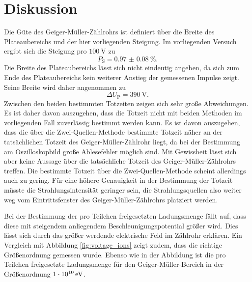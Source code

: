 \section{Diskussion}
\label{sec:Diskussion}
Die Güte des Geiger-Müller-Zählrohrs ist definiert über die Breite des Plateaubereichs und der hier vorliegenden Steigung.
Im vorliegenden Versuch ergibt sich die Steigung pro $\SI{100}{\volt}$ zu
\begin{equation*}
  P_{\mathrm{S}}=\SI{0.97(8)}{\percent} \text{.}
\end{equation*}
Die Breite des Plateaubereichs lässt sich nicht eindeutig angeben, da sich zum Ende des Plateaubereichs kein weiterer Anstieg der gemessenen Impulse zeigt.
Seine Breite wird daher angenommen zu
\begin{equation*}
  \Delta U_\mathrm{P}=\SI{390}{\volt}\text{.}
\end{equation*}
Zwischen den beiden bestimmten Totzeiten zeigen sich sehr große Abweichungen.
Es ist daher davon auszugehen, dass die Totzeit nicht mit beiden Methoden im vorliegenden Fall zuverlässig bestimmt werden kann. Es ist davon auszugehen, dass die über die Zwei-Quellen-Methode bestimmte Totzeit näher an der tatsächlichen Totzeit des Geiger-Müller-Zählrohr liegt, da bei der Bestimmung am Oszilloskopbild große Ablesefehler möglich sind.
Mit Gewissheit lässt sich aber keine Aussage über die tatsächliche Totzeit des Geiger-Müller-Zählrohrs treffen.
Die bestimmte Totzeit über die Zwei-Quellen-Methode scheint allerdings auch zu gering.
Für eine höhere Genauigkeit in der Bestimmung der Totzeit müsste die Strahlungsintensität geringer sein, die Strahlungsquellen also weiter weg vom Eintrittsfenster des Geiger-Müller-Zählrohrs platziert werden.


Bei der Bestimmung der pro Teilchen freigesetzten Ladungsmenge fällt auf, dass diese mit steigendem anliegendem Beschleunigungspotential größer wird.
Dies lässt sich durch das größer werdende elektrische Feld im Zählrohr erklären.
Ein Vergleich mit Abbildung \ref{fig:voltage_ions} zeigt zudem, dass die richtige Größenordnung gemessen wurde. Ebenso wie in der Abbildung ist die pro Teilchen freigesetzte Ladungsmenge für den Geiger-Müller-Bereich in der Größenordnung $\SI{1E10}{\electronvolt}$.
